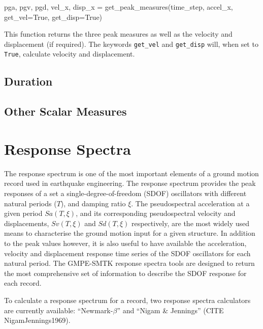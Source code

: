 \begin{python}[frame=single]
pga, pgv, pgd, vel_x, disp_x = get_peak_measures(time_step,
                                                 accel_x,
                                                 get_vel=True,
                                                 get_disp=True)
\end{python}

\noindent This function returns the three peak measures as well as the velocity and displacement (if required). The keywords \verb=get_vel= and \verb=get_disp= will, when set to \verb=True=, calculate velocity and displacement.

\subsection{Duration}
\subsection{Other Scalar Measures}

\section{Response Spectra}
\label{sec:response_spectra}

The response spectrum is one of the most important elements of a ground motion record used in earthquake engineering. The response spectrum provides the peak responses of a set a single-degree-of-freedom (SDOF) oscillators with different natural periods ($T$), and damping ratio $\xi$. The pseudospectral acceleration at a given period $Sa \left({T, \xi} \right)$, and its corresponding pseudospectral velocity and displacements, $Sv \left( {T, \xi} \right)$ and $Sd \left( {T, \xi} \right)$ respectively, are the most widely used means to characterise the ground motion input for a given structure. In addition to the peak values however, it is also useful to have available the acceleration, velocity and displacement response time series of the SDOF oscillators for each natural period. The GMPE-SMTK response spectra tools are designed to return the most comprehensive set of information to describe the SDOF response for each record.

To calculate a response spectrum for a record, two response spectra calculators are currently available: ``Newmark-$\beta$'' and ``Nigam \& Jennings'' (CITE NigamJennings1969).

